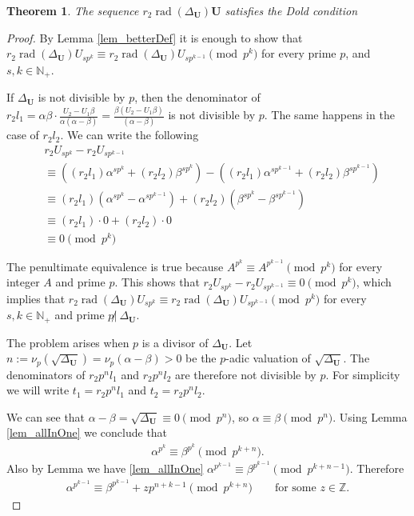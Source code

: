 \documentclass[preprint,12pt]{elsarticle}
\newcommand{\N}{\mathbb{N}}
\newcommand{\Z}{\mathbb{Z}}
\DeclareMathOperator{\rad}{rad}
\newtheorem{theorem}{Theorem}
\begin{document}
\begin{theorem} \label{theor_rad}
    The sequence $r_2\rad(\Delta_{\mathbf U})\mathbf U$ satisfies the Dold condition
\end{theorem}
\begin{proof}
    By Lemma \ref{lem_betterDef} it is enough to show that $r_2\rad(\Delta_{\mathbf U}) U_{sp^k} \equiv r_2\rad(\Delta_{\mathbf U}) U_{sp^{k-1}} \pmod{p^k}$ for every prime $p$, and $s,k\in\N_+$.
    
    If $\Delta_{\mathbf U}$ is not divisible by $p$, then the denominator of $r_2l_1 = \alpha\beta\cdot \frac{U_2 - U_1\beta}{\alpha(\alpha-\beta)} = \frac{\beta(U_2 - U_1\beta)}{(\alpha-\beta)}$ is not divisible by $p$. The same happens in the case of $r_2l_2$. We can write the following
    \begin{align}
        & r_2U_{sp^k} - r_2U_{sp^{k-1}} \\&\equiv 
        ((r_2l_1)\alpha^{sp^k}+(r_2l_2)\beta^{sp^k}) -  ((r_2l_1)\alpha^{sp^{k-1}}+(r_2l_2)\beta^{sp^{k-1}})  \\&\equiv 
        (r_2l_1)(\alpha^{sp^k} - \alpha^{sp^{k-1}}) +(r_2l_2)(\beta^{sp^k} -\beta^{sp^{k-1}}) \\&\equiv 
        (r_2l_1)\cdot 0 + (r_2l_2)\cdot 0  \\&\equiv 
        0
        \pmod {p^k}
    \end{align}

    The penultimate equivalence is true because  $A^{p^k}\equiv A^{p^{k-1}} \pmod {p^k}$ for every integer $A$ and prime $p$. This shows that $r_2U_{sp^k} - r_2U_{sp^{k-1}} \equiv 0 \pmod{p^k}$, which implies that $r_2\rad(\Delta_{\mathbf U}) U_{sp^k} \equiv r_2\rad(\Delta_{\mathbf U}) U_{sp^{k-1}} \pmod{p^k}$ for every $s,k\in \N_+$ and prime $p\not|\ \Delta_\mathbf{U}$.

    The problem arises when $p$ is a divisor of $\Delta_{\mathbf U}$. Let $n:=\nu_p(\sqrt{\Delta_{\mathbf U}}) = \nu_p(\alpha-\beta) > 0$ be the $p$-adic valuation of $\sqrt{\Delta_{\mathbf U}}$. The denominators of $r_2p^nl_1$ and $r_2p^nl_2$ are therefore not divisible by $p$. For simplicity we will write $t_1 = r_2p^nl_1$ and $t_2 = r_2p^nl_2$. 
    
    We can see that $\alpha - \beta = \sqrt{\Delta_{\mathbf U}} \equiv 0 \pmod{p^n}$, so $\alpha \equiv \beta \pmod{p^n}$. Using Lemma \ref{lem_allInOne} we conclude that
    \begin{align} \label{nn1}
        \alpha^{p^{k}} \equiv \beta^{p^k} \pmod{p^{k+n}}.
    \end{align}
    Also by Lemma we have \ref{lem_allInOne} $\alpha^{p^{k-1}} \equiv \beta^{p^{k-1}} \pmod{p^{k+n-1}}$. Therefore
    \begin{align}\label{nn2}
        \alpha^{p^{k-1}} \equiv \beta^{p^{k-1}} +zp^{n+k-1} \pmod{p^{k+n}}
        \quad\quad\text{for some $z\in\Z$}.
    \end{align}
     

\end{proof}
\end{document}
